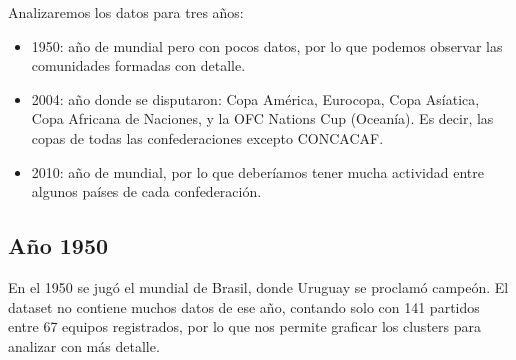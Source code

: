 \documentclass{article}
\begin{document}
Analizaremos los datos para tres años:
\begin{itemize}
    \item 1950: año de mundial pero con pocos datos, por lo que podemos observar las comunidades formadas con detalle.
    \item 2004: año donde se disputaron: Copa América, Eurocopa, Copa Asíatica, Copa Africana de Naciones, 
    y la OFC Nations Cup (Oceanía). Es decir, las copas de todas las confederaciones excepto CONCACAF.
    \item 2010: año de mundial, por lo que deberíamos tener mucha actividad entre algunos países de cada confederación.
\end{itemize}

\subsection{Año 1950}

En el 1950 se jugó el mundial de Brasil, donde Uruguay se proclamó campeón. El dataset no contiene muchos datos de ese año, contando solo con 141 partidos entre 67 equipos registrados, por lo que
nos permite graficar los clusters para analizar con más detalle.
\end{document}
